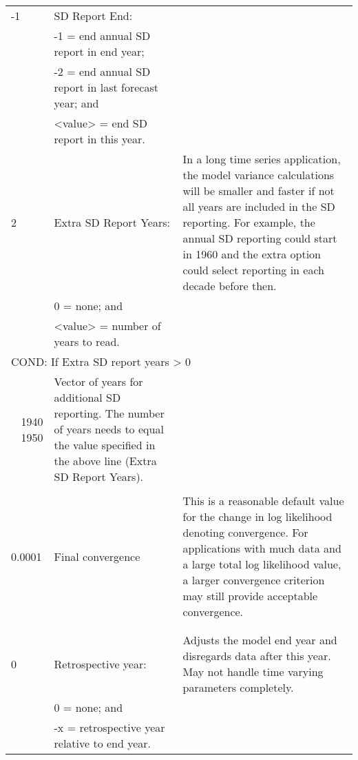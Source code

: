 {\begin{landscape}
\begin{longtable}{p{1.5cm} p{7.2cm} p{12.3cm}}
 \hline
 -1 & SD Report End: & \Tstrut\\
    & -1 = end annual SD report in end year; & \\
    & -2 = end annual SD report in last forecast year; and & \\
    & <value> = end SD report in this year. & \Bstrut\\
	   
 \hline
 2 & Extra SD Report Years: & \multirow{1}{1cm}[-0.25cm]{\parbox{12.5cm}{In a long time series application, the model variance calculations will be smaller and faster if not all years are included in the SD reporting. For example, the annual SD reporting could start in 1960 and the extra option could select reporting in each decade before then.}} \Tstrut \Bstrut\\
   & 0 = none; and & \\
   & <value> = number of years to read. & \Bstrut\\

 \hline  
 \multicolumn{3}{l}{COND: If Extra SD report years > 0} \Tstrut\\

 \multicolumn{1}{r}{1940 1950} & \multirow{1}{1cm}[-0.25cm]{\parbox{19.5cm}{Vector of years for additional SD reporting. The number of years needs to equal the value specified in the above line (Extra SD Report Years).}} \\
  & & \\
 
 \hline
 0.0001 & Final convergence & \multirow{1}{1cm}[-0.25cm]{\parbox{12.5cm}{This is a reasonable default value for the change in log likelihood denoting convergence. For applications with much data and a large total log likelihood value, a larger convergence criterion may still provide acceptable convergence.}} \Tstrut\Bstrut\\
   & & \Bstrut\\
   & & \Bstrut\\
 
 \hline
 0 & Retrospective year: & \multirow{1}{1cm}[-0.25cm]{\parbox{12.5cm}{Adjusts the model end year and disregards data after this year. May not handle time varying parameters completely.}} \Tstrut\\
   & 0 = none; and & \\
   & -x = retrospective year relative to end year. & \Bstrut\\
  

\end{longtable}
\end{landscape}}
